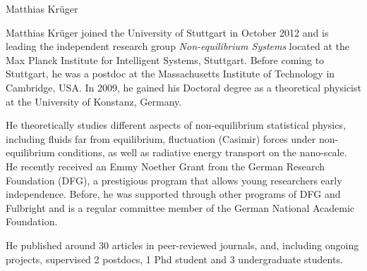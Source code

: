 \begin{participant}[type=R,PM=12,gender=male,salary=5500]{Matthias Krüger}

Matthias Krüger joined the University of Stuttgart in October 2012 and is leading the
independent research group {\it Non-equilibrium Systems} located at the Max Planck Institute
for Intelligent Systems, Stuttgart. Before coming to Stuttgart, he was a postdoc at the
Massachusetts Institute of Technology in Cambridge, USA.  In 2009, he gained his Doctoral
degree as a theoretical physicist at the University of Konstanz, Germany.

He theoretically studies different aspects of non-equilibrium statistical physics, including
fluids far from equilibrium, fluctuation (Casimir) forces under non-equilibrium conditions,
as well as radiative energy transport on the nano-scale.
%
He recently received an Emmy Noether Grant from the German Research Foundation (DFG), a
prestigious program that allows young researchers early independence.  Before, he was
supported through other programs of DFG and Fulbright and is a regular committee member of
the German National Academic Foundation.

He published around 30 articles in peer-reviewed journals, and, including ongoing projects, supervised 2 postdocs, 1 Phd student and 3 undergraduate students.

\end{participant}